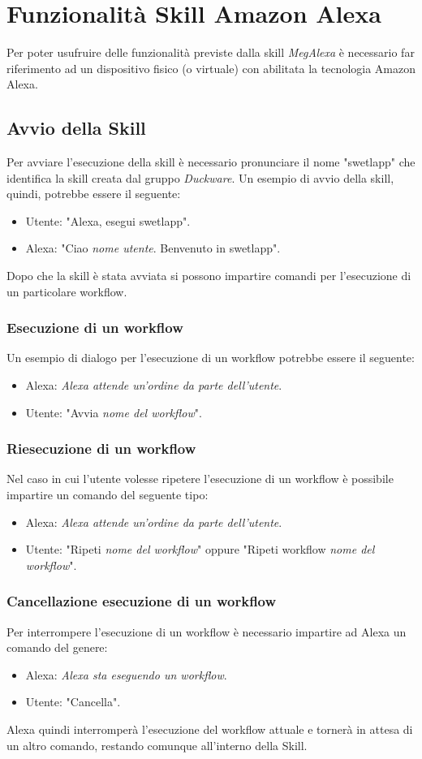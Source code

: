 \clearpage
\section{Funzionalità Skill Amazon Alexa}
\label{sec:sec_interazione_amazon_alexa}
Per poter usufruire delle funzionalità previste dalla skill \textit{MegAlexa} è necessario far riferimento ad un dispositivo fisico (o virtuale) con abilitata la tecnologia Amazon Alexa.
\subsection{Avvio della Skill}
Per avviare l'esecuzione della skill è necessario pronunciare il nome "swetlapp" che identifica la skill creata dal gruppo \textit{Duckware}. Un esempio di avvio della skill, quindi, potrebbe essere il seguente:
\begin{itemize}
	\item Utente: "Alexa, esegui swetlapp".
	\item Alexa: "Ciao \textit{nome utente}. Benvenuto in swetlapp".
\end{itemize}
Dopo che la skill è stata avviata si possono impartire comandi per l'esecuzione di un particolare workflow.
\subsubsection{Esecuzione di un workflow}
Un esempio di dialogo per l'esecuzione di un workflow potrebbe essere il seguente:
\begin{itemize}
	\item Alexa: \textit{Alexa attende un'ordine da parte dell'utente}.
	\item Utente: "Avvia \textit{nome del workflow}".
\end{itemize}
\subsubsection{Riesecuzione di un workflow}
Nel caso in cui l'utente volesse ripetere l'esecuzione di un workflow è possibile impartire un comando del seguente tipo:
\begin{itemize}
	\item Alexa: \textit{Alexa attende un'ordine da parte dell'utente}.
	\item Utente: "Ripeti \textit{nome del workflow}" oppure "Ripeti workflow \textit{nome del workflow}".
\end{itemize}
\subsubsection{Cancellazione esecuzione di un workflow}
Per interrompere l'esecuzione di un workflow è necessario impartire ad Alexa un comando del genere:
\begin{itemize}
	\item Alexa: \textit{Alexa sta eseguendo un workflow}.
	\item Utente: "Cancella".
\end{itemize}
Alexa quindi interromperà l'esecuzione del workflow attuale e tornerà in attesa di un altro comando, restando comunque all'interno della Skill.
